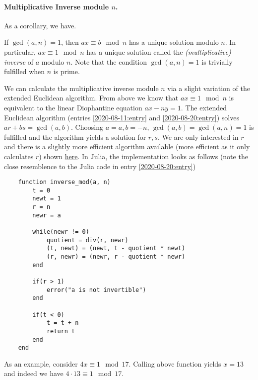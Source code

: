 \paragraph{Multiplicative Inverse module $n$.} As a corollary, we have.

\begin{theorem}
    If $\gcd(a,n) = 1$, then $a x \equiv b \mod n$ has a unique solution modulo $n$. In particular, $a x \equiv 1 \mod n$ has a unique solution called the \emph{(multiplicative) inverse} of $a$ modulo $n$. Note that the condition $\gcd(a,n) = 1$ is trivially fulfilled when $n$ is prime.
\end{theorem}

We can calculate the multiplicative inverse module $n$ via a slight variation of the extended Euclidean algorithm. From above we know that $ax \equiv 1 \mod n$ is equivalent to the linear Diophantine equation $ax - ny = 1$. The extended Euclidean algorithm (entries \ref{2020-08-11:entry} and \ref{2020-08-20:entry}) solves $ar + bs = \gcd(a,b)$. Choosing $a = a, b = -n$, $\gcd(a,b) = \gcd(a, n) = 1$ is fulfilled and the algorithm yields a solution for $r,s$. We are only interested in $r$ and there is a slightly more efficient algorithm available (more efficient as it only calculates $r$) shown \href{https://en.wikipedia.org/wiki/Extended_Euclidean_algorithm}{here}. In Julia, the implementation looks as follows (note the close resemblence to the Julia code in entry \ref{2020-08-20:entry})

\begin{verbatim}
    function inverse_mod(a, n)
        t = 0
        newt = 1
        r = n
        newr = a

        while(newr != 0)
            quotient = div(r, newr)
            (t, newt) = (newt, t - quotient * newt) 
            (r, newr) = (newr, r - quotient * newr)
        end

        if(r > 1)
            error("a is not invertible")
        end

        if(t < 0)
            t = t + n
            return t
        end
    end
\end{verbatim}

As an example, consider $4x \equiv 1 \mod 17$. Calling above function yields $x = 13$ and indeed we have $4 \cdot 13 \equiv 1 \mod 17$.





